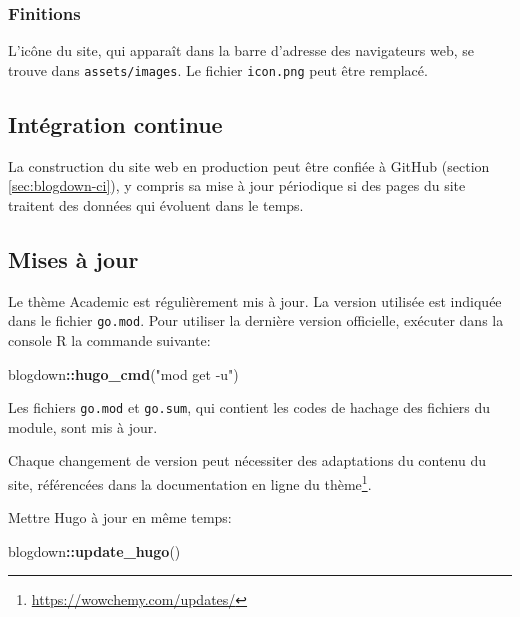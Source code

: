 \documentclass[
  12pt,
  french,
  a4paper,
  extrafontsizes,onecolumn,openright
  ]{memoir}
\newenvironment{Shaded}{\begin{snugshade}}{\end{snugshade}}
\newcommand{\KeywordTok}[1]{\textcolor[rgb]{0.13,0.29,0.53}{\textbf{#1}}}
\newcommand{\NormalTok}[1]{#1}
\newcommand{\OperatorTok}[1]{\textcolor[rgb]{0.81,0.36,0.00}{\textbf{#1}}}
\newcommand{\StringTok}[1]{\textcolor[rgb]{0.31,0.60,0.02}{#1}}
\begin{document}
\hypertarget{finitions-1}{%
\subsubsection{Finitions}\label{finitions-1}}

L'icône du site, qui apparaît dans la barre d'adresse des navigateurs web, se trouve dans \texttt{assets/images}.
Le fichier \texttt{icon.png} peut être remplacé.

\hypertarget{sec:rediger-web-ci}{%
\subsection{Intégration continue}\label{sec:rediger-web-ci}}

La construction du site web en production peut être confiée à GitHub (section \ref{sec:blogdown-ci}), y compris sa mise à jour périodique si des pages du site traitent des données qui évoluent dans le temps.

\hypertarget{mises-uxe0-jour-1}{%
\subsection{Mises à jour}\label{mises-uxe0-jour-1}}

Le thème Academic est régulièrement mis à jour.
La version utilisée est indiquée dans le fichier \texttt{go.mod}.
Pour utiliser la dernière version officielle, exécuter dans la console R la commande suivante:

\scriptsize

\begin{Shaded}
\begin{Highlighting}[]
\NormalTok{blogdown}\OperatorTok{::}\KeywordTok{hugo_cmd}\NormalTok{(}\StringTok{"mod get -u"}\NormalTok{)}
\end{Highlighting}
\end{Shaded}

\normalsize

Les fichiers \texttt{go.mod} et \texttt{go.sum}, qui contient les codes de hachage des fichiers du module, sont mis à jour.

Chaque changement de version peut nécessiter des adaptations du contenu du site, référencées dans la documentation en ligne du thème\footnote{\url{https://wowchemy.com/updates/}}.

Mettre Hugo à jour en même temps:

\scriptsize

\begin{Shaded}
\begin{Highlighting}[]
\NormalTok{blogdown}\OperatorTok{::}\KeywordTok{update_hugo}\NormalTok{()}
\end{Highlighting}
\end{Shaded}
\end{document}
